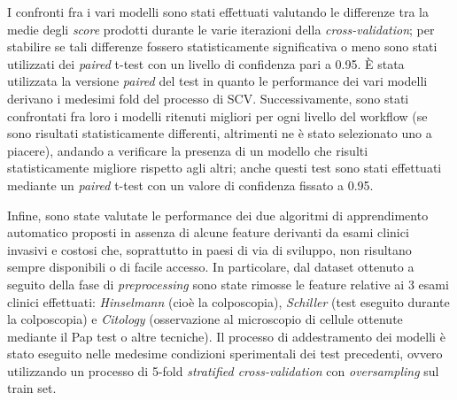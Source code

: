 I confronti fra i vari modelli sono stati effettuati valutando le differenze tra la medie degli \textit{score} prodotti durante le varie iterazioni della \textit{cross-validation}; per stabilire se tali differenze fossero statisticamente significativa o meno sono stati utilizzati dei \textit{paired} t-test con un livello di confidenza pari a 0.95.
È stata utilizzata la versione \textit{paired} del test in quanto le performance dei vari modelli derivano i medesimi fold del processo di SCV.
Successivamente, sono stati confrontati fra loro i modelli ritenuti migliori per ogni livello del workflow (se sono risultati statisticamente differenti, altrimenti ne è stato selezionato uno a piacere), andando a verificare la presenza di un modello che risulti statisticamente migliore rispetto agli altri; anche questi test sono stati effettuati mediante un \textit{paired} t-test con un valore di confidenza fissato a 0.95.

Infine, sono state valutate le performance dei due algoritmi di apprendimento automatico proposti in assenza di alcune feature derivanti da esami clinici invasivi e costosi che, soprattutto in paesi di via di sviluppo, non risultano sempre disponibili o di facile accesso.
In particolare, dal dataset ottenuto a seguito della fase di \textit{preprocessing} sono state rimosse le feature relative ai 3 esami clinici effettuati: \textit{Hinselmann} (cioè la colposcopia), \textit{Schiller} (test eseguito durante la colposcopia) e \textit{Citology} (osservazione al microscopio di cellule ottenute mediante il Pap test o altre tecniche).
Il processo di addestramento dei modelli è stato eseguito nelle medesime condizioni sperimentali dei test precedenti, ovvero utilizzando un processo di 5-fold \textit{stratified cross-validation} con \textit{oversampling} sul train set.